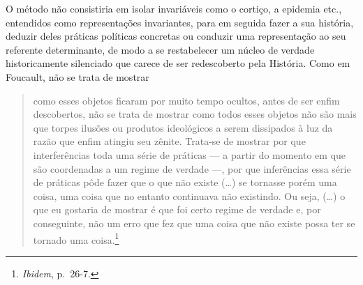 O método não consistiria em isolar invariáveis como o cortiço, a
epidemia etc., entendidos como representações invariantes, para em
seguida fazer a sua história, deduzir deles práticas políticas concretas
ou conduzir uma representação ao seu referente determinante, de modo a
se restabelecer um núcleo de verdade historicamente silenciado que
carece de ser redescoberto pela História. Como em Foucault, não se trata
de mostrar

\begin{quote}
como esses objetos ficaram por muito tempo ocultos, antes de ser enfim
descobertos, não se trata de mostrar como todos esses objetos não são
mais que torpes ilusões ou produtos ideológicos a serem dissipados à luz
da razão que enfim atingiu seu zênite. Trata-se de mostrar por que
interferências toda uma série de práticas --- a partir do momento em que
são coordenadas a um regime de verdade ---, por que inferências essa
série de práticas pôde fazer que o que não existe (\ldots{}) se tornasse
porém uma coisa, uma coisa que no entanto continuava não existindo. Ou
seja, (\ldots{}) o que eu gostaria de mostrar é que foi certo regime de
verdade e, por conseguinte, não um erro que fez que uma coisa que não
existe possa ter se tornado uma coisa.\footnote{\textit{Ibidem}, p.~26-7.}
\end{quote}

